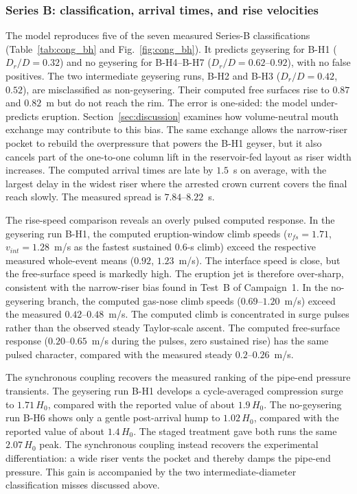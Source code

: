 \subsubsection{Series B: classification, arrival times, and rise velocities}
\label{sec:tests:cong2017:seriesB}

The model reproduces five of the seven measured Series-B classifications
(Table~\ref{tab:cong_bh} and Fig.~\ref{fig:cong_bh}). It predicts geysering for
B-H1 ($D_r/D=0.32$) and no geysering for B-H4--B-H7
($D_r/D=0.62$--$0.92$), with no false positives. The two intermediate
geysering runs, B-H2 and B-H3 ($D_r/D=0.42$, $0.52$), are misclassified as
non-geysering. Their computed free surfaces rise to $0.87$ and $0.82$~m but do
not reach the rim. The error is one-sided: the model under-predicts eruption.
Section~\ref{sec:discussion} examines how volume-neutral mouth exchange may
contribute to this bias. The same exchange allows the narrow-riser pocket to
rebuild the overpressure that powers the B-H1 geyser, but it also cancels part
of the one-to-one column lift in the reservoir-fed layout as riser width
increases. The computed arrival times are late by $1.5$~s on average, with the
largest delay in the widest riser where the arrested crown current covers the
final reach slowly. The measured spread is $7.84$--$8.22$~s.

The rise-speed comparison reveals an overly pulsed computed response. In the
geysering run B-H1, the computed eruption-window climb speeds
($v_{fs}=1.71$, $v_{int}=1.28$~m/s as the fastest sustained $0.6$-s climb)
exceed the respective measured whole-event means ($0.92$, $1.23$~m/s). The
interface speed is close, but the free-surface speed is markedly high. The
eruption jet is therefore over-sharp, consistent with the narrow-riser bias
found in Test~B of Campaign~1. In the no-geysering branch, the computed gas-nose climb speeds
($0.69$--$1.20$~m/s) exceed the measured $0.42$--$0.48$~m/s. The computed
climb is concentrated in surge pulses rather than the observed steady
Taylor-scale ascent. The computed free-surface response
($0.20$--$0.65$~m/s during the pulses, zero sustained rise) has the same pulsed
character, compared with the measured steady $0.2$--$0.26$~m/s.

The synchronous coupling recovers the measured ranking of the pipe-end
pressure transients. The geysering run B-H1 develops a cycle-averaged
compression surge to $1.71\,H_0$, compared with the reported value of about
$1.9\,H_0$. The no-geysering run B-H6 shows only a gentle post-arrival hump to
$1.02\,H_0$, compared with the reported value of about $1.4\,H_0$. The staged
treatment gave both runs the same $2.07\,H_0$ peak. The synchronous coupling
instead recovers the experimental differentiation: a wide riser vents the
pocket and thereby damps the pipe-end pressure. This gain is accompanied by
the two intermediate-diameter classification misses discussed above.

